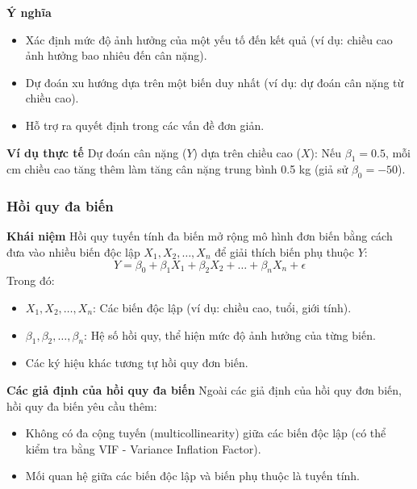 \documentclass[a4paper,12pt]{article}
\begin{document}
\textbf{Ý nghĩa}  
\begin{itemize}
    \item Xác định mức độ ảnh hưởng của một yếu tố đến kết quả (ví dụ: chiều cao ảnh hưởng bao nhiêu đến cân nặng).  
    \item Dự đoán xu hướng dựa trên một biến duy nhất (ví dụ: dự đoán cân nặng từ chiều cao).  
    \item Hỗ trợ ra quyết định trong các vấn đề đơn giản.  
\end{itemize}


\textbf{Ví dụ thực tế}  
Dự đoán cân nặng (\(Y\)) dựa trên chiều cao (\(X\)): Nếu \(\beta_1 = 0.5\), mỗi cm chiều cao tăng thêm làm tăng cân nặng trung bình 0.5 kg (giả sử \(\beta_0 = -50\)).

\subsubsection*{Hồi quy đa biến}
\textbf{Khái niệm}  
Hồi quy tuyến tính đa biến mở rộng mô hình đơn biến bằng cách đưa vào nhiều biến độc lập \(X_1, X_2, \dots, X_n\) để giải thích biến phụ thuộc \(Y\):  
\begin{equation}
    Y = \beta_0 + \beta_1 X_1 + \beta_2 X_2 + \dots + \beta_n X_n + \epsilon
\end{equation}
Trong đó:  
\begin{itemize}
    \item \(X_1, X_2, \dots, X_n\): Các biến độc lập (ví dụ: chiều cao, tuổi, giới tính).  
    \item \(\beta_1, \beta_2, \dots, \beta_n\): Hệ số hồi quy, thể hiện mức độ ảnh hưởng của từng biến.  
    \item Các ký hiệu khác tương tự hồi quy đơn biến.  
\end{itemize}

\textbf{Các giả định của hồi quy đa biến}  
Ngoài các giả định của hồi quy đơn biến, hồi quy đa biến yêu cầu thêm:  
\begin{itemize}
    \item Không có đa cộng tuyến (multicollinearity) giữa các biến độc lập (có thể kiểm tra bằng VIF - Variance Inflation Factor).  
    \item Mối quan hệ giữa các biến độc lập và biến phụ thuộc là tuyến tính.  
\end{itemize}
\end{document}
